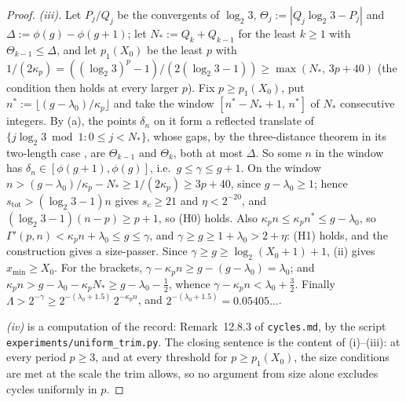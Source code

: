 \documentclass[11pt]{article}
\theoremstyle{remark}
\newcommand{\LL}{\log_2 3}
\newcommand{\kp}{\kappa_p}
\newcommand{\stot}{s_{\mathrm{tot}}}
\begin{document}
\begin{proof}
\emph{(iii).} Let $P_j/Q_j$ be the convergents of $\LL$, $\Theta_j := |Q_j\LL - P_j|$ and $\Delta := \phi(g) - \phi(g+1)$; let $N_\ast := Q_k + Q_{k-1}$ for the least $k \ge 1$ with $\Theta_{k-1} \le \Delta$, and let $p_1(X_0)$ be the least $p$ with $1/(2\kp) = ((\LL)^p - 1)/(2(\LL - 1)) \ge \max(N_\ast,\, 3p + 40)$ (the condition then holds at every larger $p$). Fix $p \ge p_1(X_0)$, put $n^\ast := \lfloor (g - \lambda_0)/\kp \rfloor$ and take the window $[n^\ast - N_\ast + 1,\, n^\ast]$ of $N_\ast$ consecutive integers. By (a), the points $\delta_n$ on it form a reflected translate of $\{j\LL \bmod 1 : 0 \le j < N_\ast\}$, whose gaps, by the three-distance theorem in its two-length case \cite{sos,swierczkowski}, are $\Theta_{k-1}$ and $\Theta_k$, both at most $\Delta$. So some $n$ in the window has $\delta_n \in [\phi(g+1), \phi(g)]$, i.e.\ $g \le \gamma \le g+1$. On the window $n > (g - \lambda_0)/\kp - N_\ast \ge 1/(2\kp) \ge 3p + 40$, since $g - \lambda_0 \ge 1$; hence $\stot > (\LL - 1)n$ gives $s_c \ge 21$ and $\eta < 2^{-20}$, and $(\LL-1)(n-p) \ge p + 1$, so (H0) holds. Also $\kp n \le \kp n^\ast \le g - \lambda_0$, so $\Gamma'(p,n) < \kp n + \lambda_0 \le g \le \gamma$, and $\gamma \ge g \ge 1 + \lambda_0 > 2 + \eta$: (H1) holds, and the construction gives a size-passer. Since $\gamma \ge g \ge \log_2(X_0+1) + 1$, (ii) gives $x_{\min} \ge X_0$. For the brackets, $\gamma - \kp n \ge g - (g - \lambda_0) = \lambda_0$; and $\kp n > g - \lambda_0 - \kp N_\ast \ge g - \lambda_0 - \tfrac12$, whence $\gamma - \kp n < \lambda_0 + \tfrac32$. Finally $\Lambda > 2^{-\gamma} \ge 2^{-(\lambda_0 + 1.5)}\,2^{-\kp n}$, and $2^{-(\lambda_0+1.5)} = 0.05405\ldots$.

\emph{(iv)} is a computation of the record: Remark~12.8.3 of \texttt{cycles.md}, by the script \texttt{experiments/\allowbreak uniform\_\allowbreak trim.py}. The closing sentence is the content of (i)--(iii): at every period $p \ge 3$, and at every threshold for $p \ge p_1(X_0)$, the size conditions are met at the scale the trim allows, so no argument from size alone excludes cycles uniformly in $p$.
\end{proof}
\end{document}
